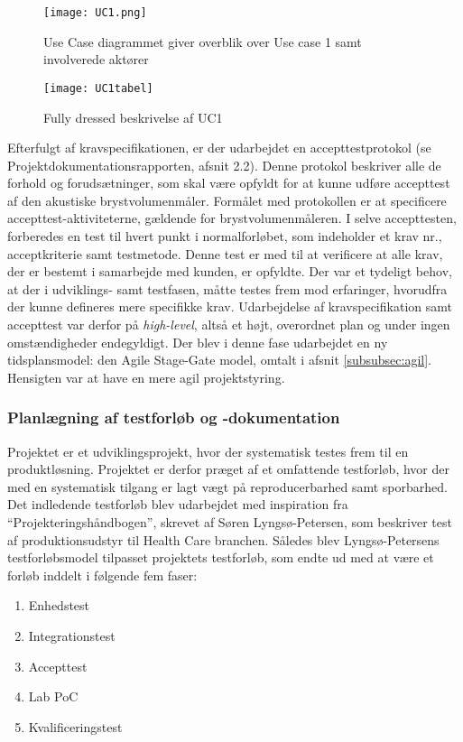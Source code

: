 	 \begin{figure}[htb]
	\centering	
	\texttt{[image: UC1.png]}
	\caption{Use Case diagrammet
 giver overblik over Use case 1 samt involverede aktører}
	\label{fig:UC}
	\end{figure}
	
	\begin{figure}[htb]
	\texttt{[image: UC1tabel]}
	\caption{Fully dressed beskrivelse af UC1}
	\label{UCtabel}
	\end{figure}
	
	Efterfulgt af kravspecifikationen, er der udarbejdet en  accepttestprotokol (se Projektdokumentationsrapporten, afsnit 2.2). Denne protokol beskriver alle de forhold og forudsætninger, som skal være opfyldt for at kunne udføre accepttest af den akustiske brystvolumenmåler. Formålet med protokollen er at specificere accepttest-aktiviteterne, gældende for brystvolumenmåleren. 
	I selve accepttesten, forberedes en test til hvert punkt i normalforløbet, som indeholder et krav nr., acceptkriterie samt testmetode. Denne test er med til at verificere at alle krav, der er bestemt i samarbejde med kunden, er opfyldte. 	
	Der var et tydeligt behov, at der i udviklings- samt testfasen, måtte testes frem mod erfaringer, hvorudfra der kunne defineres mere specifikke krav. Udarbejdelse af kravspecifikation samt accepttest var derfor på \textit{high-level}, altså et højt, overordnet plan og under ingen omstændigheder endegyldigt. Der blev i denne fase udarbejdet en ny tidsplansmodel: den Agile Stage-Gate model, omtalt i afsnit \ref{subsubsec:agil}. Hensigten var at have en mere agil projektstyring. 
	
	\subsubsection{Planlægning af testforløb og -dokumentation}
	\label{subsubsec:test}
	Projektet er et udviklingsprojekt, hvor der systematisk testes frem til en produktløsning. Projektet er derfor præget af et omfattende testforløb, hvor der med en systematisk tilgang er lagt vægt på reproducerbarhed samt sporbarhed. 
Det indledende testforløb blev udarbejdet med inspiration fra “Projekteringshåndbogen”, skrevet af Søren Lyngsø-Petersen, som beskriver test af produktionsudstyr til Health Care branchen. Således blev Lyngsø-Petersens testforløbsmodel tilpasset projektets testforløb, som endte ud med at være et forløb inddelt i følgende fem faser:    

	\begin{enumerate}
		\item Enhedstest
		\item Integrationstest
		\item Accepttest
		\item Lab PoC
		\item Kvalificeringstest 
	\end{enumerate}

